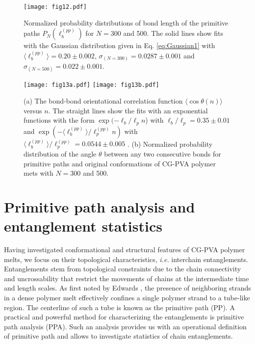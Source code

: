 \documentclass[pre,showpacs,notitlepage,twocolumn]{revtex4-1}
\begin{document}
%

%

%
 \begin{figure}[h]
\texttt{[image: fig12.pdf]}
\caption{Normalized probability distributions of  bond length of the primitive paths $P_N(\ell_b^{(pp)})$ for $N=300$ and 500. The solid lines show  fits with 
the Gaussian distribution given in Eq. \eqref{eq:Gaussian1} with $\langle \ell_b^{(pp)}\rangle=0.20 \pm 0.002$, $\sigma_{(N=300)}=0.0287 \pm 0.001$ and $\sigma_{(N=500)}=0.022 \pm 0.001$. }
\label{fig12} 
\end{figure}
%
\begin{figure*}[t]
\texttt{[image: fig13a.pdf]}
\texttt{[image: fig13b.pdf]}
\caption{(a) The bond-bond orientational correlation function $ \langle \cos \theta  (n) \rangle$ versus $n$.  The straight  lines show the fits  with an exponential  functions with 
the form $\exp(-\ell_b/\ell_p n$) with $\ell_b/\ell_p=0.35 \pm 0.01$ and $\exp(-\langle \ell_b^{(pp)}\rangle/\ell_p^{(pp)} n)$ with $\langle \ell_b^{(pp)}\rangle/\ell_p^{(pp)}=0.0544 \pm 0.005$ .  (b) Normalized probability distribution of the angle $\theta$ between any two consecutive bonds for  primitive paths and original conformations of  CG-PVA polymer mets with $N=300$ and 500.  }
\label{fig13} 
\end{figure*}

\section*{Primitive path analysis and entanglement statistics}
%

%
Having investigated conformational and structural features of CG-PVA polymer melts, we  focus on their topological characteristics, {\it i.e.} interchain entanglements. 
Entanglements stem from topological constraints due to the chain  connectivity and uncrossability that restrict the  movements of chains at the intermediate time and length scales.  As first noted by Edwards 
\cite{Edwardstube}, the presence of neighboring strands in a dense polymer melt effectively confines  a single polymer strand to a tube-like region.  The  centerline  of such a tube is known as the primitive path (PP).   
 A practical and powerful method for characterizing the entanglements is primitive path analysis (PPA). Such an analysis provides us with an operational definition of primitive path and allows   to investigate  statistics of chain  entanglements. 
\end{document}
